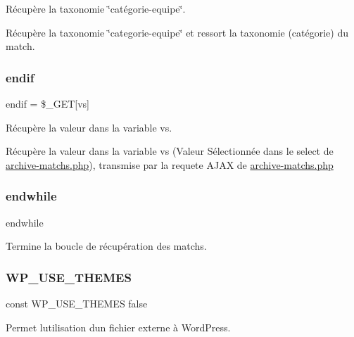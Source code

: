 Récupère la taxonomie \char`\"{}catégorie-\/equipe\char`\"{}. 

Récupère la taxonomie \char`\"{}categorie-\/equipe\char`\"{} et ressort la taxonomie (catégorie) du match. \hypertarget{tri-categorie-match_8php_a82cd33ca97ff99f2fcc5e9c81d65251b}{}\label{tri-categorie-match_8php_a82cd33ca97ff99f2fcc5e9c81d65251b} 
\subsubsection{\texorpdfstring{endif}{endif}}
{\footnotesize\ttfamily endif = \$\+\_\+\+G\+ET\mbox{[}\textquotesingle{}vs\textquotesingle{}\mbox{]}}



Récupère la valeur dans la variable \textquotesingle{}vs\textquotesingle{}. 

Récupère la valeur dans la variable \textquotesingle{}vs\textquotesingle{} (Valeur Sélectionnée dans le select de \hyperlink{archive-matchs_8php}{archive-\/matchs.\+php}), transmise par la requete A\+J\+AX de \hyperlink{archive-matchs_8php}{archive-\/matchs.\+php} \hypertarget{tri-categorie-match_8php_a1b05dae45f9e3f4c1fe86048550d2c5b}{}\label{tri-categorie-match_8php_a1b05dae45f9e3f4c1fe86048550d2c5b} 
\subsubsection{\texorpdfstring{endwhile}{endwhile}}
{\footnotesize\ttfamily endwhile}



Termine la boucle de récupération des matchs. 

\hypertarget{tri-categorie-match_8php_ae50604b6dd85409f240bf13253215ba4}{}\label{tri-categorie-match_8php_ae50604b6dd85409f240bf13253215ba4} 
\subsubsection{\texorpdfstring{W\+P\+\_\+\+U\+S\+E\+\_\+\+T\+H\+E\+M\+ES}{WP\_USE\_THEMES}}
{\footnotesize\ttfamily const W\+P\+\_\+\+U\+S\+E\+\_\+\+T\+H\+E\+M\+ES false}



Permet l\textquotesingle{}utilisation d\textquotesingle{}un fichier externe à Word\+Press. 

